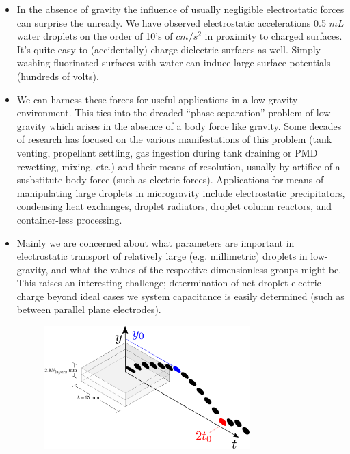 \documentclass[a4paper, 12pt]{article}
\begin{document}
\begin{itemize}
\item In the absence of gravity the influence of usually negligible electrostatic forces can surprise the unready. We have observed electrostatic accelerations 0.5 $mL$ water droplets on the order of 10's of $cm/s^2$ in proximity to charged surfaces. It's quite easy to (accidentally) charge dielectric surfaces as well. Simply washing fluorinated surfaces with water can induce large surface potentials (hundreds of volts).

\item We can harness these forces for useful applications in a low-gravity environment. This ties into the dreaded ``phase-separation'' problem of low-gravity which arises in the absence of a body force like gravity. Some decades of research has focused on the various manifestations of this problem (tank venting, propellant settling, gas ingestion during tank draining or PMD rewetting, mixing, etc.) and their means of resolution, usually by artifice of a susbstitute body force (such as electric forces). Applications for means of manipulating large droplets in microgravity include electrostatic precipitators, condensing heat exchanges, droplet radiators, droplet column reactors, and container-less processing.

\item Mainly we are concerned about what parameters are important in electrostatic transport of relatively large (e.g. millimetric) droplets in low-gravity, and what the values of the respective dimensionless groups might be. This raises an interesting challenge; determination of net droplet electric charge beyond ideal cases we system capacitance is easily determined (such as between parallel plane electrodes).


\begin{figure}[ht]
 \centering
 \includegraphics[width=0.75\textwidth]{../figures/apparatus0.pdf}
\end{figure}

\end{itemize}
\end{document}
